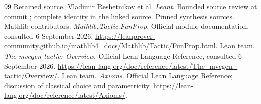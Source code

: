 \documentclass[11pt,letterpaper]{article}
\newcommand{\code}[1]{\texttt{\detokenize{#1}}}
\theoremstyle{definition}\newtheorem{definition}[proposition]{Definition}
\theoremstyle{remark}\newtheorem{remark}[proposition]{Remark}
\begin{document}
\begin{thebibliography}{99}
\href{evidence/karst-moraine-obsidian/primary/S_Algebra_exists_algHom_equiv_pi.lean}{Retained source}.
 Vladimir Reshetnikov et al. \emph{Leant}.
Bounded source review at commit \code{823259f}; complete identity in the linked source.
\href{https://github.com/VladimirReshetnikov/Leant/tree/823259f7e3c6d24e990d3f48f78c4f1c4f88059e/src/Leant/Synth}{Pinned synthesis sources}.
 Mathlib contributors. \emph{Mathlib.Tactic.FunProp}.
Official module documentation, consulted 6 September 2026.
\url{https://leanprover-community.github.io/mathlib4_docs/Mathlib/Tactic/FunProp.html}.
 Lean team. \emph{The mvcgen tactic: Overview}.
Official Lean Language Reference, consulted 6 September 2026.
\url{https://lean-lang.org/doc/reference/latest/The--mvcgen--tactic/Overview/}.
 Lean team. \emph{Axioms}.
Official Lean Language Reference; discussion of classical choice and parametricity.
\url{https://lean-lang.org/doc/reference/latest/Axioms/}.
\end{thebibliography}
\end{document}
